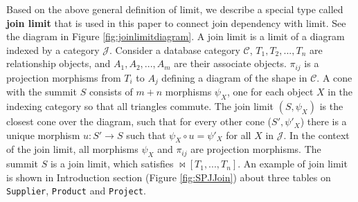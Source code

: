 


Based on the above general definition of limit, we describe a special type called \textbf{join limit} that is used in this paper to connect join dependency with limit. See the diagram in Figure \ref{fig:joinlimitdiagram}. A join limit is a limit of a diagram indexed by a  category $\mathcal{J}$. Consider a database category $\mathcal{C}$, $T_1,T_2,...,T_n$ are relationship objects, and $A_1,A_2,...,A_m$ are their associate objects. $\pi_{ij}$ is a projection morphisms from $T_i$ to $A_j$ defining a diagram of the shape in $\mathcal{C}$. A cone with the summit $S$ consists of  $m+n$ morphisms $\psi_X$, one for each object $X$ in the indexing category so that all triangles commute. The join limit $(S,\psi_X)$ is the closest cone over the diagram, such that for every other cone ($S', \psi'_X$) there is a unique morphism $u: S' \to S$ such that $\psi_X \circ u = \psi'_X$ for all $X$ in $\mathcal{J}$. In the context of the join limit, all morphisms $\psi_X$ and $\pi_{ij}$ are projection morphisms. The summit $S$ is a join limit, which satisfies $\bowtie[T_1,...,T_n]$. An example of join limit is shown in Introduction section (Figure \ref{fig:SPJJoin}) about three tables on \texttt{Supplier}, \texttt{Product} and \texttt{Project}.









